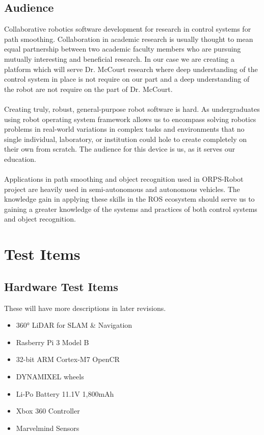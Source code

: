 \documentclass[english,12pt]{article}
\begin{document}
\subsection{Audience}
Collaborative robotics software development for research in control systems 
for path smoothing. Collaboration in academic research is usually thought to mean 
equal partnership between two academic faculty members who are pursuing mutually 
interesting and beneficial research. In our case we are creating a platform which 
will serve Dr. McCourt research where deep understanding of the control system in 
place is not require on our part and a deep understanding of the robot are not 
require on the part of Dr. McCourt.\\\\
Creating truly, robust, general-purpose robot software is hard. As 
undergraduates using robot operating system framework allows us to encompass 
solving robotics problems in real-world variations in complex tasks and 
environments that no single individual, laboratory, or institution could 
hole to create completely on their own from scratch. The audience for this 
device is us, as it serves our education.\\\\
Applications in path smoothing and object recognition used in 
ORPS-Robot project are heavily used in semi-autonomous and autonomous 
vehicles. The knowledge gain in applying these skills in the ROS ecosystem 
should serve us to gaining a greater knowledge of the systems and 
practices of both control systems and object recognition.
\section{Test Items}
\subsection{Hardware Test Items}
These will have more descriptions in later revisions.
\begin{itemize}
    \item[] \ang{360} LiDAR for SLAM \& Navigation
    \item[] Rasberry Pi 3 Model B
    \item[] 32-bit ARM Cortex-M7 OpenCR
    \item[] DYNAMIXEL wheels
    \item[] Li-Po Battery 11.1V 1,800mAh 
    \item[] Xbox 360 Controller 
    \item[] Marvelmind Sensors
\end{itemize}
\end{document}
